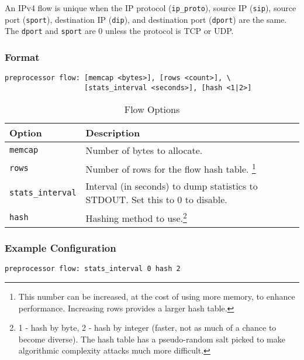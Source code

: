 \documentclass[english]{report}
\begin{document}
An IPv4 flow is unique when the IP protocol (\texttt{ip\_proto}), source IP (\texttt{sip}),
source port (\texttt{sport}), destination IP (\texttt{dip}), and destination port (\texttt{dport}) are the
same.  The \texttt{dport} and \texttt{sport} are 0 unless the protocol is TCP or UDP.

\subsubsection{Format}
\begin{verbatim}
preprocessor flow: [memcap <bytes>], [rows <count>], \
                   [stats_interval <seconds>], [hash <1|2>]
\end{verbatim}

\begin{table}[hbpt]{}
\caption{Flow Options}
\begin{minipage}[hbpt]{6in}
\begin{center}\begin{tabular}{| l | l |}
\hline 
\textbf{Option} & \textbf{Description}\\
\hline
\hline
\texttt{memcap} &
Number of bytes to allocate.\\
\hline 
\texttt{rows} & Number of rows for the flow hash table. \footnote[1]{This number can be increased, at the cost of using more memory, to enhance performance. Increasing rows provides a larger hash table.}\\
\hline 
\texttt{stats\_interval} &
Interval (in seconds) to dump statistics to STDOUT. Set this to 0 to disable.\\
\hline 
\texttt{hash} & Hashing method to use.\footnote[2]{1 - hash by byte, 2 - hash by integer (faster, not as much of a chance to become diverse).  The hash table has a pseudo-random salt picked to make algorithmic complexity attacks much more difficult.}   \\
\hline
\end{tabular}
\end{center}
\end{minipage}
\end{table}

\subsubsection{Example Configuration}

\begin{verbatim}
preprocessor flow: stats_interval 0 hash 2
\end{verbatim}
\end{document}
